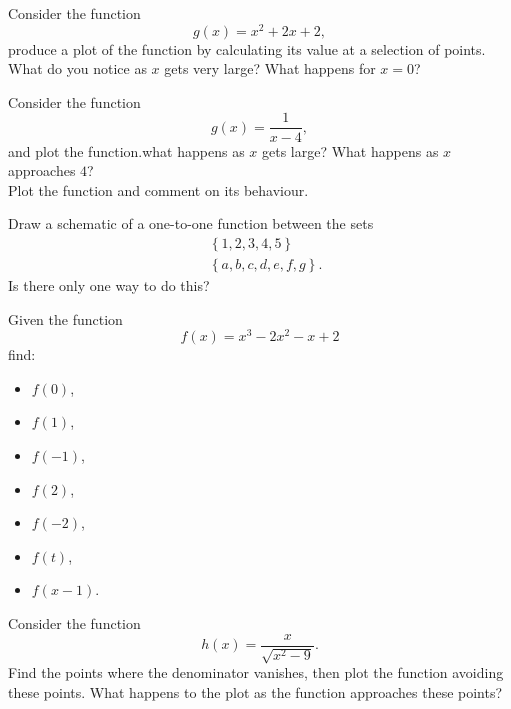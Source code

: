 \begin{problem}[$\star$]
Consider the function
\begin{equation*}
g(x)=x^2+2x+2,
\end{equation*}
produce a plot of the function by calculating its value at a selection of points. What do you notice as $x$ gets very large? What happens for $x=0$?
\end{problem}

\begin{problem}[$\star$]
Consider the function
\begin{equation*}
g(x)=\frac{1}{x-4},
\end{equation*}
and plot the function.what happens as $x$ gets large? What happens as $x$ approaches $4$?\\

Plot the function and comment on its behaviour.
\end{problem}

\begin{problem}
Draw a schematic of a one-to-one function between the sets
\begin{equation*}
\begin{split}
&\left\{1,2,3,4,5\right\}\\
&\left\{a,b,c,d,e,f,g\right\}.
\end{split}
\end{equation*}
Is there only one way to do this?
\end{problem}




\begin{problem}[$\star$]
Given the function
\begin{equation*}
f(x)=x^3-2x^2-x+2
\end{equation*}
find:
\begin{itemize}
    \item $f(0)$,
    \item $f(1)$,
    \item $f(-1)$,
    \item $f(2)$,
    \item $f(-2)$,
    \item $f(t)$,
    \item $f(x-1)$.
\end{itemize}
\end{problem}

\begin{problem}
Consider the function
\begin{equation*}
h(x)=\frac{x}{\sqrt{x^{2}-9}}.
\end{equation*}
Find the points where the denominator vanishes, then plot the function avoiding these points. What happens to the plot as the function approaches these points?
\end{problem}


